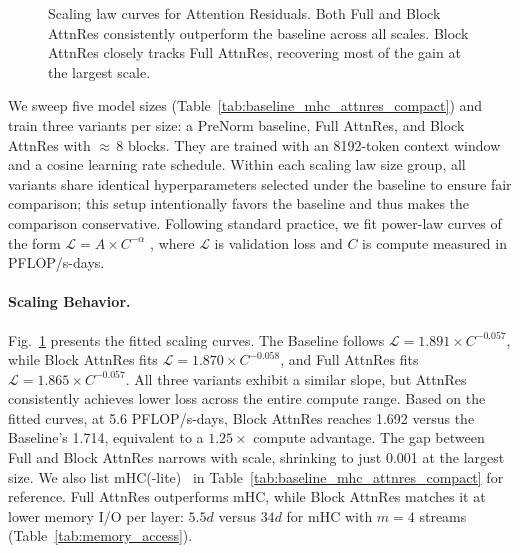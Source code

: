 \begin{figure}[t]
    \caption{Scaling law curves for Attention Residuals. Both Full and Block AttnRes consistently outperform the baseline across all scales. Block AttnRes closely tracks Full AttnRes, recovering most of the gain at the largest scale.}
    \label{fig:scaling_law}
\end{figure}



We sweep five model sizes (Table~\ref{tab:baseline_mhc_attnres_compact}) and train three variants per size: a PreNorm baseline, Full AttnRes, and Block AttnRes with ${\approx}\,8$ blocks.
They are trained with an 8192-token context window and a cosine learning rate schedule.
Within each scaling law size group, all variants share identical hyperparameters selected under the baseline to ensure fair comparison; this setup intentionally favors the baseline and thus makes the comparison conservative. Following standard practice, we fit power-law curves of the form $\mathcal{L} = A \times C^{-\alpha}$ \cite{kaplan2020scalinglawsneurallanguage,hoffmann2022trainingcomputeoptimallargelanguage}, where $\mathcal{L}$ is validation loss and $C$ is compute measured in PFLOP/s-days.

\paragraph{Scaling Behavior.}
Fig.~\ref{fig:scaling_law} presents the fitted scaling curves. The Baseline follows $\mathcal{L} = 1.891 \times C^{-0.057}$, while Block AttnRes fits $\mathcal{L} = 1.870 \times C^{-0.058}$, and Full AttnRes fits $\mathcal{L} = 1.865 \times C^{-0.057}$. All three variants exhibit a similar slope, but AttnRes consistently achieves lower loss across the entire compute range. Based on the fitted curves, at 5.6 PFLOP/s-days, Block AttnRes reaches 1.692 versus the Baseline's 1.714, equivalent to a $1.25\times$ compute advantage. The gap between Full and Block AttnRes narrows with scale, shrinking to just 0.001 at the largest size.
We also list mHC(-lite)~\cite{yang2026mhclite} in Table~\ref{tab:baseline_mhc_attnres_compact} for reference. Full AttnRes outperforms mHC, while Block AttnRes matches it at lower memory I/O per layer: $5.5d$ versus $34d$ for mHC with $m{=}4$ streams (Table~\ref{tab:memory_access}).


